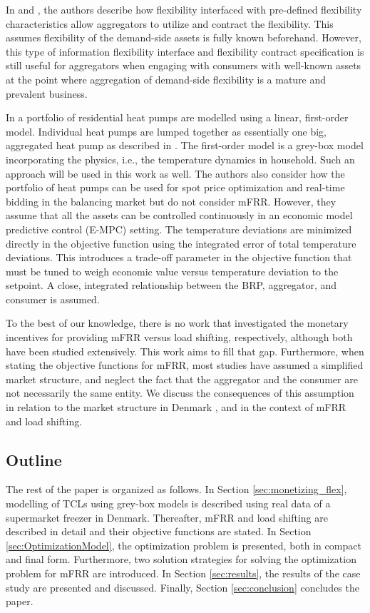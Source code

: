 In \cite{biegel2013information} and \cite{BiegelConstractingFlexServices}, the authors describe how flexibility interfaced with pre-defined flexibility characteristics allow aggregators to utilize and contract the flexibility. This assumes flexibility of the demand-side assets is fully known beforehand. However, this type of information flexibility interface and flexibility contract specification is still useful for aggregators when engaging with consumers with well-known assets at the point where aggregation of demand-side flexibility is a mature and prevalent business.

In \cite{biegel2013electricity} a portfolio of residential heat pumps are modelled using a linear, first-order model. Individual heat pumps are lumped together as essentially one big, aggregated heat pump as described in \cite{biegel2013lumped}. The first-order model is a grey-box model incorporating the physics, i.e., the temperature dynamics in household. Such an approach will be used in this work as well. The authors also consider how the portfolio of heat pumps can be used for spot price optimization and real-time bidding in the balancing market but do not consider mFRR. However, they assume that all the assets can be controlled continuously in an economic model predictive control (E-MPC) setting. The temperature deviations are minimized directly in the objective function using the integrated error of total temperature deviations. This introduces a trade-off parameter in the objective function that must be tuned to weigh economic value versus temperature deviation to the setpoint. A close, integrated relationship between the BRP, aggregator, and consumer is assumed.

To the best of our knowledge, there is no work that investigated the monetary incentives for providing mFRR versus load shifting, respectively, although both have been studied extensively. This work aims to fill that gap. Furthermore, when stating the objective functions for mFRR, most studies have assumed a simplified market structure, and neglect the fact that the aggregator and the consumer are not necessarily the same entity. We discuss the consequences of this assumption in relation to the market structure in Denmark \cite{gade2022ecosystem}, and in the context of mFRR and load shifting.

\subsection{Outline}

The rest of the paper is organized as follows. In Section \ref{sec:monetizing_flex}, modelling of TCLs using grey-box models is described using real data of a supermarket freezer in Denmark. Thereafter, mFRR and load shifting are described in detail and their objective functions are stated. In Section \ref{sec:OptimizationModel}, the optimization problem is presented, both in compact and final form. Furthermore, two solution strategies for solving the optimization problem for mFRR are introduced. In Section \ref{sec:results}, the results of the case study are presented and discussed. Finally, Section \ref{sec:conclusion} concludes the paper.
